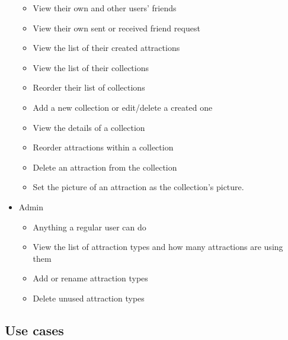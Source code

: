\begin{itemize}
\begin{itemize}
        \item View their own and other users' friends
        \item View their own sent or received friend request
        \item View the list of their created attractions
        \item View the list of their collections
        \item Reorder their list of collections
        \item Add a new collection or edit/delete a created one
        \item View the details of a collection
        \item Reorder attractions within a collection
        \item Delete an attraction from the collection
        \item Set the picture of an attraction as the collection's picture.
    \end{itemize}
    \item Admin
    \begin{itemize}
        \item Anything a regular user can do
        \item View the list of attraction types and how many attractions are using them
        \item Add or rename attraction types
        \item Delete unused attraction types
    \end{itemize}
\end{itemize}


\subsection{Use cases}
\clearpage %

